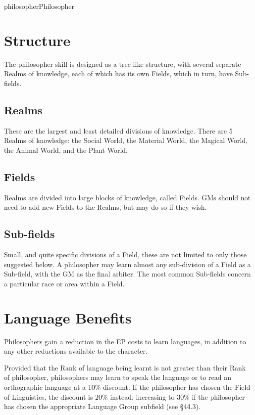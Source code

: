\begin{Skill}[2.0]{philosopher}{Philosopher}
\section{Structure }

The philosopher skill is designed as a tree-like structure, with
several separate Realms of knowledge, each of which has its own
Fields, which in turn, have Sub-fields.

\subsection{Realms}

These are the largest and least detailed divisions of knowledge. There
are 5 Realms of knowledge: the Social World, the Material World, the
Magical World, the Animal World, and the Plant World.

\subsection{Fields}

Realms are divided into large blocks of knowledge, called Fields.  GMs
should not need to add new Fields to the Realms, but may do so if they
wish.

\subsection{Sub-fields}

Small, and quite specific divisions of a Field, these are not limited
to only those suggested below.  A philosopher may learn almost any
sub-division of a Field as a Sub-field, with the GM as the final
arbiter.  The most common Sub-fields concern a particular race or
area within a Field.

\section{Language Benefits}

Philosophers gain a reduction in the EP costs to learn languages, in
addition to any other reductions available to the character.

Provided that the Rank of language being learnt is not greater than
their Rank of philosopher, philosophers may learn to speak the
language or to read an orthographic language at a 10\% discount.  If
the philosopher has chosen the Field of Linguistics, the discount is
20\% instead, increasing to 30\% if the philosopher has chosen the
appropriate Language Group subfield (see §44.3).


\end{Skill}
